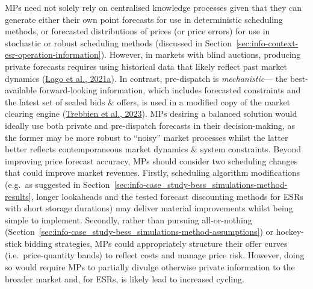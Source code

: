 \documentclass[12pt,a4paper,]{report}
\begin{document}
MPs need not solely rely on centralised knowledge processes given that
they can generate either their own point forecasts for use in
deterministic scheduling methods, or forecasted distributions of prices
(or price errors) for use in stochastic or robust scheduling methods
(discussed in Section~\ref{sec:info-context-esr-operation-information}).
However, in markets with blind auctions, producing private forecasts
requires using historical data that likely reflect past market dynamics
(\protect\hyperlink{ref-lagoForecastingDayaheadElectricity2021}{Lago et
al., 2021a}). In contrast, pre-dispatch is \emph{mechanistic}--- the
best-available forward-looking information, which includes forecasted
constraints and the latest set of sealed bids \& offers, is used in a
modified copy of the market clearing engine
(\protect\hyperlink{ref-trebbienUnderstandingElectricityPrices2023}{Trebbien
et al., 2023}). MPs desiring a balanced solution would ideally use both
private and pre-dispatch forecasts in their decision-making, as the
former may be more robust to ``noisy'' market processes whilst the
latter better reflects contemporaneous market dynamics \& system
constraints. Beyond improving price forecast accuracy, MPs should
consider two scheduling changes that could improve market revenues.
Firstly, scheduling algorithm modifications (e.g.~as suggested in
Section~\ref{sec:info-case_study-bess_simulations-method-results},
longer lookaheads and the tested forecast discounting methods for ESRs
with short storage durations) may deliver material improvements whilst
being simple to implement. Secondly, rather than pursuing all-or-nothing
(Section~\ref{sec:info-case_study-bess_simulations-method-assumptions})
or hockey-stick bidding strategies, MPs could appropriately structure
their offer curves (i.e.~price-quantity bands) to reflect costs and
manage price risk. However, doing so would require MPs to partially
divulge otherwise private information to the broader market and, for
ESRs, is likely lead to increased cycling.
\end{document}
